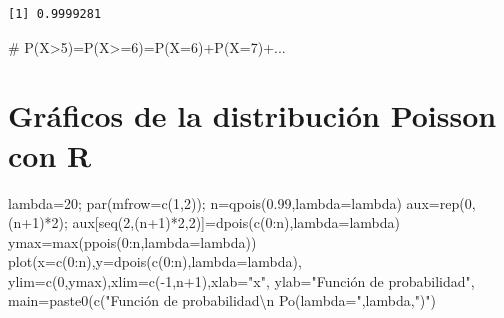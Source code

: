 \documentclass[
  letterpaper,
  DIV=11,
  numbers=noendperiod]{scrreprt}
\newenvironment{Shaded}{\begin{snugshade}}{\end{snugshade}}
\newcommand{\AttributeTok}[1]{\textcolor[rgb]{0.40,0.45,0.13}{#1}}
\newcommand{\CommentTok}[1]{\textcolor[rgb]{0.37,0.37,0.37}{#1}}
\newcommand{\DecValTok}[1]{\textcolor[rgb]{0.68,0.00,0.00}{#1}}
\newcommand{\FloatTok}[1]{\textcolor[rgb]{0.68,0.00,0.00}{#1}}
\newcommand{\FunctionTok}[1]{\textcolor[rgb]{0.28,0.35,0.67}{#1}}
\newcommand{\NormalTok}[1]{\textcolor[rgb]{0.00,0.23,0.31}{#1}}
\newcommand{\OtherTok}[1]{\textcolor[rgb]{0.00,0.23,0.31}{#1}}
\newcommand{\SpecialCharTok}[1]{\textcolor[rgb]{0.37,0.37,0.37}{#1}}
\newcommand{\StringTok}[1]{\textcolor[rgb]{0.13,0.47,0.30}{#1}}
\begin{document}
\begin{verbatim}
[1] 0.9999281
\end{verbatim}

\begin{Shaded}
\begin{Highlighting}[]
\CommentTok{\# P(X\textgreater{}5)=P(X\textgreater{}=6)=P(X=6)+P(X=7)+...}
\end{Highlighting}
\end{Shaded}

\section{Gráficos de la distribución Poisson con
R}\label{gruxe1ficos-de-la-distribuciuxf3n-poisson-con-r}

\begin{Shaded}
\begin{Highlighting}[]
\NormalTok{lambda}\OtherTok{=}\DecValTok{20}\NormalTok{; }\FunctionTok{par}\NormalTok{(}\AttributeTok{mfrow=}\FunctionTok{c}\NormalTok{(}\DecValTok{1}\NormalTok{,}\DecValTok{2}\NormalTok{)); n}\OtherTok{=}\FunctionTok{qpois}\NormalTok{(}\FloatTok{0.99}\NormalTok{,}\AttributeTok{lambda=}\NormalTok{lambda)}
\NormalTok{aux}\OtherTok{=}\FunctionTok{rep}\NormalTok{(}\DecValTok{0}\NormalTok{,(n}\SpecialCharTok{+}\DecValTok{1}\NormalTok{)}\SpecialCharTok{*}\DecValTok{2}\NormalTok{); aux[}\FunctionTok{seq}\NormalTok{(}\DecValTok{2}\NormalTok{,(n}\SpecialCharTok{+}\DecValTok{1}\NormalTok{)}\SpecialCharTok{*}\DecValTok{2}\NormalTok{,}\DecValTok{2}\NormalTok{)]}\OtherTok{=}\FunctionTok{dpois}\NormalTok{(}\FunctionTok{c}\NormalTok{(}\DecValTok{0}\SpecialCharTok{:}\NormalTok{n),}\AttributeTok{lambda=}\NormalTok{lambda)}
\NormalTok{ymax}\OtherTok{=}\FunctionTok{max}\NormalTok{(}\FunctionTok{ppois}\NormalTok{(}\DecValTok{0}\SpecialCharTok{:}\NormalTok{n,}\AttributeTok{lambda=}\NormalTok{lambda)) }
\FunctionTok{plot}\NormalTok{(}\AttributeTok{x=}\FunctionTok{c}\NormalTok{(}\DecValTok{0}\SpecialCharTok{:}\NormalTok{n),}\AttributeTok{y=}\FunctionTok{dpois}\NormalTok{(}\FunctionTok{c}\NormalTok{(}\DecValTok{0}\SpecialCharTok{:}\NormalTok{n),}\AttributeTok{lambda=}\NormalTok{lambda),}
     \AttributeTok{ylim=}\FunctionTok{c}\NormalTok{(}\DecValTok{0}\NormalTok{,ymax),}\AttributeTok{xlim=}\FunctionTok{c}\NormalTok{(}\SpecialCharTok{{-}}\DecValTok{1}\NormalTok{,n}\SpecialCharTok{+}\DecValTok{1}\NormalTok{),}\AttributeTok{xlab=}\StringTok{"x"}\NormalTok{, }\AttributeTok{ylab=}\StringTok{"Función de probabilidad"}\NormalTok{,}
     \AttributeTok{main=}\FunctionTok{paste0}\NormalTok{(}\FunctionTok{c}\NormalTok{(}\StringTok{"Función de probabilidad}\SpecialCharTok{\textbackslash{}n}\StringTok{  Po(lambda="}\NormalTok{,lambda,}\StringTok{")"}\NormalTok{)}

\end{Highlighting}
\end{Shaded}
\end{document}
